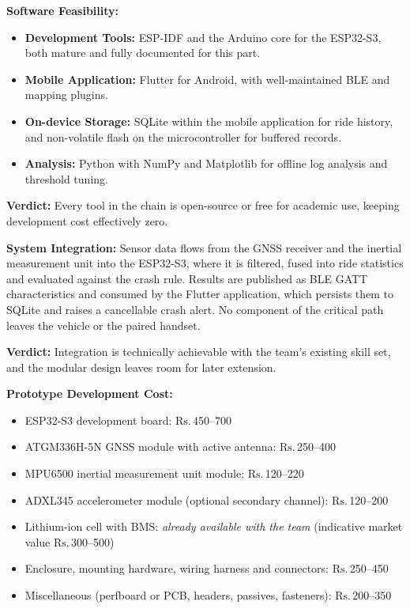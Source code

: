 \documentclass[12pt,a4paper,oneside]{report}
\newcommand{\rupee}{\textrm{Rs.}\,}
\newcommand{\verdict}[1]{\par\noindent\textbf{Verdict:} #1\par}
\begin{document}
\vspace{0.8em}
\noindent\hspace{0.6em}\textbf{Software Feasibility:}
\begin{itemize}[leftmargin=*,itemsep=0.35em,topsep=0.5em]
\item \textbf{Development Tools:} ESP-IDF and the Arduino core for the ESP32-S3, both
mature and fully documented for this part.
\item \textbf{Mobile Application:} Flutter for Android, with well-maintained BLE and
mapping plugins.
\item \textbf{On-device Storage:} SQLite within the mobile application for ride history,
and non-volatile flash on the microcontroller for buffered records.
\item \textbf{Analysis:} Python with NumPy and Matplotlib for offline log analysis and
threshold tuning.
\end{itemize}
\verdict{Every tool in the chain is open-source or free for academic use, keeping
development cost effectively zero.}

\vspace{0.6em}
\noindent\hspace{0.6em}\textbf{System Integration:} Sensor data flows from the GNSS receiver
and the inertial measurement unit into the ESP32-S3, where it is filtered, fused into ride
statistics and evaluated against the crash rule. Results are published as BLE GATT
characteristics and consumed by the Flutter application, which persists them to SQLite and
raises a cancellable crash alert. No component of the critical path leaves the vehicle or
the paired handset.
\verdict{Integration is technically achievable with the team's existing skill set, and the
modular design leaves room for later extension.}
\clearpage

\thispagestyle{empty}
\noindent\hspace{0.6em}{\large\bfseries (ii) ECONOMIC FEASIBILITY}\par
\vspace{1.1em}

\noindent\textbf{Prototype Development Cost:}
\begin{itemize}[leftmargin=*,itemsep=0.3em,topsep=0.5em]
\item ESP32-S3 development board: \(\rupee\)450--700
\item ATGM336H-5N GNSS module with active antenna: \(\rupee\)250--400
\item MPU6500 inertial measurement unit module: \(\rupee\)120--220
\item ADXL345 accelerometer module (optional secondary channel): \(\rupee\)120--200
\item Lithium-ion cell with BMS: \emph{already available with the team} (indicative market
value \(\rupee\)300--500)
\item Enclosure, mounting hardware, wiring harness and connectors: \(\rupee\)250--450
\item Miscellaneous (perfboard or PCB, headers, passives, fasteners): \(\rupee\)200--350
\end{itemize}
\end{document}
